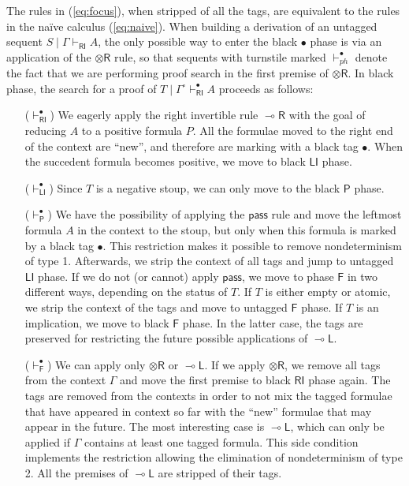 \documentclass[submission,copyright,creativecommons]{eptcs}
\theoremstyle{definition}
\newcommand{\tl}{\otimes \mathsf{L}}
\newcommand{\tr}{\otimes \mathsf{R}}
\newcommand{\lright}{{\multimap}\mathsf{R}}
\newcommand{\lleft}{{\multimap}\mathsf{L}}
\newcommand{\pass}{\mathsf{pass}}
\newcommand{\unitl}{\mathsf{IL}}
\newcommand{\RI}{\mathsf{RI}}
\newcommand{\LI}{\mathsf{LI}}
\newcommand{\Pass}{\mathsf{P}}
\newcommand{\F}{\mathsf{F}}
\begin{document}
The rules in (\ref{eq:focus}), when stripped of all the tags, are equivalent to the rules in the na{\"i}ve calculus (\ref{eq:naive}). When building a derivation of an untagged sequent $S \mid \Gamma \vdash_\RI A$, the only possible way to enter the black $\bullet$ phase is via an application of the $\tr$ rule, so that sequents with turnstile marked $\vdash_{ph}^\bullet$ denote the fact that we are performing proof search in the first premise of $\tr$.
In black phase, the search for a proof of $T \mid \Gamma^\circ \vdash^\bullet_\RI A$ proceeds as follows:
\begin{itemize}
\item[($\vdash^\bullet_\RI$)] We eagerly apply the right invertible rule $\lright$ with the goal of reducing $A$ to a positive formula $P$. All the formulae moved to the right end of the context are ``new'', and therefore are marking with a black tag $\bullet$.
  When the succedent formula becomes positive, we move to black $\LI$ phase.
\item[($\vdash^\bullet_\LI$)] Since $T$ is a negative stoup, we can only move to the black $\Pass$ phase.
\item[($\vdash^\bullet_\Pass$)] We have the possibility of applying the $\pass$ rule and move the leftmost formula $A$ in the context to the stoup, but only when this formula is marked by a black tag $\bullet$. This restriction makes it possible to remove nondeterminism of type 1. Afterwards, we strip the context of all tags and jump to untagged $\LI$ phase. If we do not (or cannot) apply $\pass$, we move to phase $\F$  in two different ways, depending on the status of $T$. If $T$ is either empty or atomic, we strip the context of the tags and move to untagged $\F$ phase. If $T$ is an implication, we move to black $\F$ phase. In the latter case, the tags are preserved for restricting the future possible applications of $\lleft$.
\item[($\vdash^\bullet_\F$)] We can apply only $\tr$ or $\lleft$. If we apply $\tr$, we remove all tags from the context $\Gamma$ and move the first premise to black $\RI$ phase again. The tags are removed from the contexts in order to not mix the tagged formulae that have appeared in context so far with the ``new'' formulae that may appear in the future. The most interesting case is $\lleft$, which can only be applied if $\Gamma$ contains at least one tagged formula. This side condition implements the restriction allowing the elimination of nondeterminism of type 2. All the premises of $\lleft$ are stripped of their tags.
\end{itemize}
\end{document}

